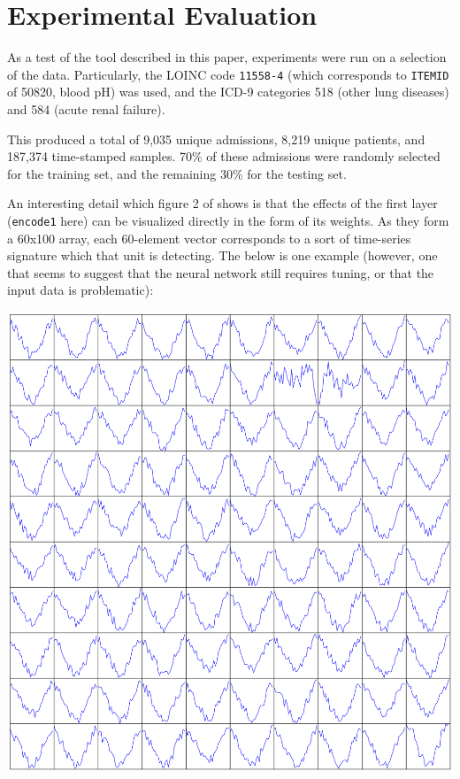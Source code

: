 \documentclass[journal]{IEEEtran}
\begin{document}
\section{Experimental Evaluation}

As a test of the tool described in this paper, experiments were run on
a selection of the data.  Particularly, the LOINC code
\texttt{11558-4} (which corresponds to \texttt{ITEMID} of 50820, blood
pH) was used, and the ICD-9 categories 518 (other lung diseases) and
584 (acute renal failure).

This produced a total of 9,035 unique admissions, 8,219 unique
patients, and 187,374 time-stamped samples.  70\% of these admissions
were randomly selected for the training set, and the remaining 30\%
for the testing set.


An interesting detail which figure 2 of \cite{Lasko2013} shows is that
the effects of the first layer (\texttt{encode1} here) can be
visualized directly in the form of its weights.  As they form a 60x100
array, each 60-element vector corresponds to a sort of time-series
signature which that unit is detecting.  The below is one example
(however, one that seems to suggest that the neural network still
requires tuning, or that the input data is problematic):

\includegraphics[width=\linewidth]{keras_1st_layer.png}
\end{document}
